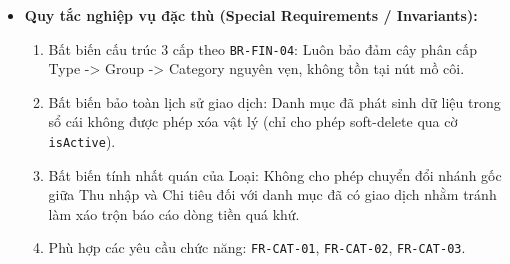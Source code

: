 \documentclass[11pt,a4paper]{article}
\providecommand{\tightlist}{
  \setlength{\itemsep}{0pt}\setlength{\parskip}{0pt}}
\begin{document}
\begin{itemize}
\begin{itemize}
    \begin{itemize}
    \tightlist
    \item
      2d3a1. Tại bước 2d3, hệ thống phát hiện đã có ít nhất một bản ghi
      giao dịch trong bảng \texttt{transactions} đang liên kết với danh
      mục này.
    \item
      2d3a2. Hệ thống từ chối xóa vật lý bản ghi và hiển thị hộp thoại
      thông báo: "Danh mục này đã có dữ liệu giao dịch phát sinh trong
      lịch sử và không thể bị xóa để bảo toàn tính toàn vẹn của sổ sách
      kế toán. Bạn có muốn chuyển danh mục này sang trạng thái ẩn (ngừng
      sử dụng) hay không?".
    \item
      2d3a3. Nếu Người dùng chọn đồng ý ẩn, hệ thống chuyển hướng thực
      hiện luồng 2b; nếu Người dùng chọn hủy, hệ thống giữ nguyên trạng
      thái danh mục.
    \end{itemize}
  \item
    \emph{2a3a. Cố ý thay đổi Loại luồng tiền (Type) của danh mục đã có
    giao dịch:}

    \begin{itemize}
    \tightlist
    \item
      2a3a1. Nếu có yêu cầu chuyển đổi một danh mục từ nhóm Chi tiêu
      sang nhóm Thu nhập (hoặc ngược lại) khi danh mục đó đã có giao
      dịch trong quá khứ.
    \item
      2a3a2. Hệ thống chặn đứng thao tác, báo lỗi vi phạm bất biến phân
      loại thu chi theo quy tắc \texttt{BR-FIN-04} và từ chối thay đổi.
    \end{itemize}
  \end{itemize}
\item
  \textbf{Quy tắc nghiệp vụ đặc thù (Special Requirements /
  Invariants):}

  \begin{enumerate}
  \def\labelenumi{\arabic{enumi}.}
  \tightlist
  \item
    Bất biến cấu trúc 3 cấp theo \texttt{BR-FIN-04}: Luôn bảo đảm cây
    phân cấp Type -\textgreater{} Group -\textgreater{} Category nguyên
    vẹn, không tồn tại nút mồ côi.
  \item
    Bất biến bảo toàn lịch sử giao dịch: Danh mục đã phát sinh dữ liệu
    trong sổ cái không được phép xóa vật lý (chỉ cho phép soft-delete
    qua cờ \texttt{isActive}).
  \item
    Bất biến tính nhất quán của Loại: Không cho phép chuyển đổi nhánh
    gốc giữa Thu nhập và Chi tiêu đối với danh mục đã có giao dịch nhằm
    tránh làm xáo trộn báo cáo dòng tiền quá khứ.
  \item
    Phù hợp các yêu cầu chức năng: \texttt{FR-CAT-01},
    \texttt{FR-CAT-02}, \texttt{FR-CAT-03}.
  \end{enumerate}
\end{itemize}
\end{document}
